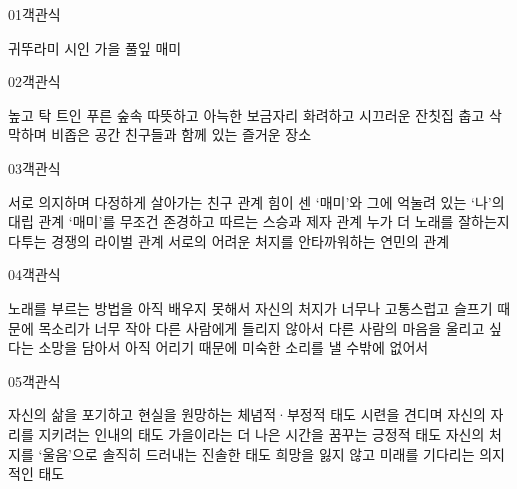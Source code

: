 \documentclass[fs9,seriesFre]{korfarm-base}
\begin{document}
\par\medskip
\kfBeginMC
\begin{kfQBlock}{01}{객관식}
\begin{kfChoices}
\kfChoice 귀뚜라미
\kfChoice 시인
\kfChoice 가을
\kfChoice 풀잎
\kfChoice 매미
\end{kfChoices}
\end{kfQBlock}
\begin{kfQBlock}{02}{객관식}
\begin{kfChoices}
\kfChoice 높고 탁 트인 푸른 숲속
\kfChoice 따뜻하고 아늑한 보금자리
\kfChoice 화려하고 시끄러운 잔칫집
\kfChoice 춥고 삭막하며 비좁은 공간
\kfChoice 친구들과 함께 있는 즐거운 장소
\end{kfChoices}
\end{kfQBlock}
\begin{kfQBlock}{03}{객관식}
\begin{kfChoices}
\kfChoice 서로 의지하며 다정하게 살아가는 친구 관계
\kfChoice 힘이 센 ‘매미’와 그에 억눌려 있는 ‘나’의 대립 관계
\kfChoice ‘매미’를 무조건 존경하고 따르는 스승과 제자 관계
\kfChoice 누가 더 노래를 잘하는지 다투는 경쟁의 라이벌 관계
\kfChoice 서로의 어려운 처지를 안타까워하는 연민의 관계
\end{kfChoices}
\end{kfQBlock}
\begin{kfQBlock}{04}{객관식}
\begin{kfChoices}
\kfChoice 노래를 부르는 방법을 아직 배우지 못해서
\kfChoice 자신의 처지가 너무나 고통스럽고 슬프기 때문에
\kfChoice 목소리가 너무 작아 다른 사람에게 들리지 않아서
\kfChoice 다른 사람의 마음을 울리고 싶다는 소망을 담아서
\kfChoice 아직 어리기 때문에 미숙한 소리를 낼 수밖에 없어서
\end{kfChoices}
\end{kfQBlock}
\begin{kfQBlock}{05}{객관식}
\begin{kfChoices}
\kfChoice 자신의 삶을 포기하고 현실을 원망하는 체념적·부정적 태도
\kfChoice 시련을 견디며 자신의 자리를 지키려는 인내의 태도
\kfChoice 가을이라는 더 나은 시간을 꿈꾸는 긍정적 태도
\kfChoice 자신의 처지를 ‘울음’으로 솔직히 드러내는 진솔한 태도
\kfChoice 희망을 잃지 않고 미래를 기다리는 의지적인 태도
\end{kfChoices}
\end{kfQBlock}
\end{document}
